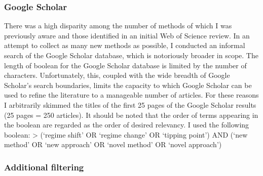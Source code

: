 \documentclass[12pt,twoside,openany]{reedthesis}
\begin{document}
\subsubsection{Google Scholar}\label{google-scholar}

There was a high disparity among the number of methods of which I was
previously aware and those identified in an initial Web of Science
review. In an attempt to collect as many new methods as possible, I
conducted an informal search of the Google Scholar database, which is
notoriously broader in scope. The length of boolean for the Google
Scholar database is limited by the number of characters. Unfortunately,
this, coupled with the wide breadth of Google Scholar's search
boundaries, limits the capacity to which Google Scholar can be used to
refine the literature to a manageable number of articles. For these
reasons I arbitrarily skimmed the titles of the first 25 pages of the
Google Scholar results (25 pages = 250 articles). It should be noted
that the order of terms appearing in the boolean are regarded as the
order of desired relevancy. I used the following boolean: \textgreater{}
(`regime shift' OR `regime change' OR `tipping point') AND (`new method'
OR `new approach' OR `novel method' OR `novel approach')

\subsubsection{Additional filtering}\label{additional-filtering}
\end{document}

